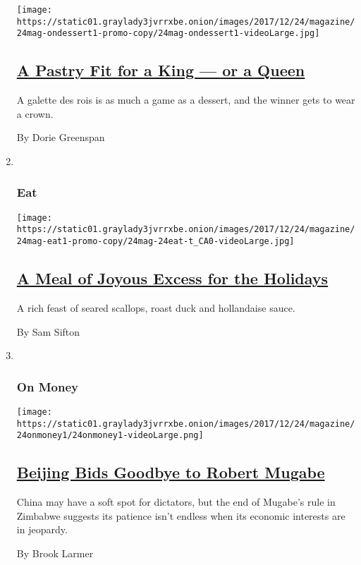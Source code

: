 \begin{enumerate}
  \texttt{[image: https://static01.graylady3jvrrxbe.onion/images/2017/12/24/magazine/24mag-ondessert1-promo-copy/24mag-ondessert1-videoLarge.jpg]}

  \hypertarget{a-pastry-fit-for-a-king--or-a-queen}{%
  \subsection{\texorpdfstring{\href{/2017/12/20/magazine/galette-rois-france-epiphany-pastry-king-queen.html}{A
  Pastry Fit for a King --- or a
  Queen}}{A Pastry Fit for a King --- or a Queen}}\label{a-pastry-fit-for-a-king--or-a-queen}}

  A galette des rois is as much a game as a dessert, and the winner gets
  to wear a crown.

  By Dorie Greenspan
\item ~
  \hypertarget{eat}{%
  \subsubsection{Eat}\label{eat}}

  \texttt{[image: https://static01.graylady3jvrrxbe.onion/images/2017/12/24/magazine/24mag-eat1-promo-copy/24mag-24eat-t\_CA0-videoLarge.jpg]}

  \hypertarget{a-meal-of-joyous-excess-for-the-holidays}{%
  \subsection{\texorpdfstring{\href{/2017/12/21/magazine/scallops-duck-hollandaise-joyous-excess-holidays.html}{A
  Meal of Joyous Excess for the
  Holidays}}{A Meal of Joyous Excess for the Holidays}}\label{a-meal-of-joyous-excess-for-the-holidays}}

  A rich feast of seared scallops, roast duck and hollandaise sauce.

  By Sam Sifton
\item ~
  \hypertarget{on-money}{%
  \subsubsection{On Money}\label{on-money}}

  \texttt{[image: https://static01.graylady3jvrrxbe.onion/images/2017/12/24/magazine/24onmoney1/24onmoney1-videoLarge.png]}

  \hypertarget{beijing-bids-goodbye-to-robert-mugabe}{%
  \subsection{\texorpdfstring{\href{/2017/12/19/magazine/beijing-bids-goodbye-to-robert-mugabe.html}{Beijing
  Bids Goodbye to Robert
  Mugabe}}{Beijing Bids Goodbye to Robert Mugabe}}\label{beijing-bids-goodbye-to-robert-mugabe}}

  China may have a soft spot for dictators, but the end of Mugabe's rule
  in Zimbabwe suggests its patience isn't endless when its economic
  interests are in jeopardy.

  By Brook Larmer
\end{enumerate}

